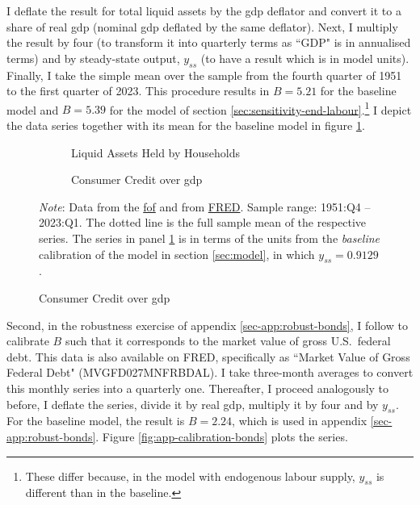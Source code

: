 \documentclass[a4paper,12pt]{article} %
\numberwithin{equation}{section} %
\numberwithin{figure}{section}
\numberwithin{table}{section}
\begin{document}
\begin{refsection}
\begin{appendices}
I deflate the result for total liquid assets by the \Gls{gdp} deflator and convert it to a share of real \Gls{gdp} (nominal \Gls{gdp} deflated by the same deflator). Next, I multiply the result by four (to transform it into quarterly terms as ``GDP" is in annualised terms) and by steady-state output, $y_{ss}$ (to have a result which is in model units). Finally, I take the simple mean over the sample from the fourth quarter of 1951 to the first quarter of 2023. This procedure results in $B=5.21$ for the baseline model and $B=5.39$ for the model of section \ref{sec:sensitivity-end-labour}.\footnote{These differ because, in the model with endogenous labour supply, $y_{ss}$ is different than in the baseline.} I depict the data series together with its mean for the baseline model in figure \ref{fig:app-calibration-liquid}.

\begin{figure}[t]
    \caption{Data for Baseline Model Calibration}
    \label{fig:app-calibration}
    \centering
    \begin{subfigure}[b]{0.49\textwidth}
    \caption{Liquid Assets Held by Households}
    \label{fig:app-calibration-liquid}
         \centering
         
     \end{subfigure}
     \hfill
     \begin{subfigure}[b]{0.49\textwidth}
     \caption{Consumer Credit over \Gls{gdp}} 
    \label{fig:app-calibration-debt}
         \centering
         
     \end{subfigure}

    \vspace{10pt}
    
    \begin{minipage}{\textwidth} 
    \footnotesize
    \textit{Note}: Data from the \href{https://www.federalreserve.gov/releases/z1/}{\Gls{fof}} and from \href{https://fred.stlouisfed.org}{FRED}. Sample range: 1951:Q4 -- 2023:Q1. The dotted line is the full sample mean of the respective series. The series in panel \ref{fig:app-calibration-liquid} is in terms of the units from the \textit{baseline} calibration of the model in section \ref{sec:model}, in which $y_{ss} = 0.9129$. 
    \end{minipage}
\end{figure}

Second, in the robustness exercise of appendix \ref{sec-app:robust-bonds}, I follow \textcite{bayer2023} to calibrate $B$ such that it corresponds to the market value of gross U.S.~federal debt. This data is also available on FRED, specifically as ``Market Value of Gross Federal Debt" (MVGFD027MNFRBDAL). I take three-month averages to convert this monthly series into a quarterly one. Thereafter, I proceed analogously to before, I deflate the series, divide it by real \Gls{gdp}, multiply it by four and by $y_{ss}$. For the baseline model, the result is $B=2.24$, which is used in appendix \ref{sec-app:robust-bonds}. Figure \ref{fig:app-calibration-bonds} plots the series.


\end{appendices}
\end{refsection}
\end{document}
